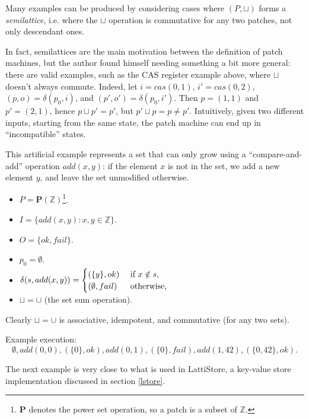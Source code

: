 \documentclass[12pt,a4paper,en]{pracamgr}
\newcommand{\ti}[1]{\textit{#1}}
\newcommand{\mbb}[1]{\mathbb{#1}}
\newcommand{\mbf}[1]{\mathbf{#1}}
\begin{document}
Many examples can be produced by considering cases where $(P, \sqcup)$ forms a \ti{semilattice}, i.e. where the $\sqcup$ operation is commutative for any two patches, not only descendant ones.

In fact, semilattices are the main motivation between the definition of patch machines, but the author found himself needing something a bit more general: there are valid examples, such as the CAS register example above, where $\sqcup$ doesn't always commute. Indeed, let $i = cas(0, 1)$, $i' = cas(0, 2)$, $(p, o) = \delta(p_0, i)$, and $(p', o') = \delta(p_0, i')$. Then $p = (1, 1)$ and $p' = (2, 1)$, hence $p \sqcup p' = p'$, but $p' \sqcup p = p \neq p'$. Intuitively, given two different inputs, starting from the same state, the patch machine can end up in ``incompatible'' states.

\begin{ex}\label{gset-machine}
	This artificial example represents a set that can only grow using a ``compare-and-add'' operation $add(x, y)$: if the element $x$ is not in the set, we add a new element $y$, and leave the set unmodified otherwise.
	\begin{itemize}
        \item $P = \mbf P(\mbb Z)$\footnote{$\mbf P$ denotes the power set operation, so a patch is a subset of $\mbb Z$.}.
		\item $I = \{add(x, y): x, y \in \mbb Z\}$.
		\item $O = \{ok, fail\}$.
		\item $p_0 = \emptyset$.
		\item $\delta(s, add(x, y)) = \smash{\begin{cases} (\{y\}, ok)&\text{ if }x \notin s,\\ (\emptyset, fail)&\text{ otherwise,}\end{cases}}$
		\item $\sqcup = \cup$ (the set sum operation).
	\end{itemize}

    Clearly $\sqcup = \cup$ is associative, idempotent, and commutative (for any two sets).

	Example execution:
	$$ \emptyset, add(0, 0), (\{0\}, ok), add(0, 1), (\{0\}, fail), add(1, 42), (\{0, 42\}, ok). $$
\end{ex}

The next example is very close to what is used in LattiStore, a key-value store implementation discussed in section \ref{lstore}.
\end{document}
